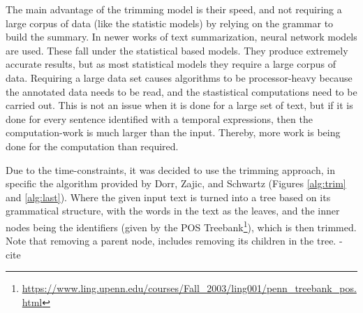 \par The main advantage of the trimming model is their speed, and not requiring a large corpus of data (like the statistic models) by relying on the grammar to build the summary. In newer works of text summarization, neural network models are used. These fall under the statistical based models. They produce extremely accurate results, but as most statistical models they require a large corpus of data. Requiring a large data set causes algorithms to be processor-heavy because the annotated data needs to be read, and the stastistical computations need to be carried out. This is not an issue when it is done for a large set of text, but if it is done for every sentence identified with a temporal expressions, then the computation-work is much larger than the input. Thereby, more work is being done for the computation than required.
\par Due to the time-constraints, it was decided to use the trimming approach, in specific the algorithm provided by Dorr, Zajic, and Schwartz \cite{dorrzajicschwartz2003} (Figures \ref{alg:trim} and \ref{alg:last}). Where the given input text is turned into a tree based on its grammatical structure, with the words in the text as the leaves, and the inner nodes being the identifiers (given by the POS Treebank\footnote{\url{https://www.ling.upenn.edu/courses/Fall_2003/ling001/penn_treebank_pos.html}}), which is then trimmed. Note that removing a parent node, includes removing its children in the tree.
-cite


